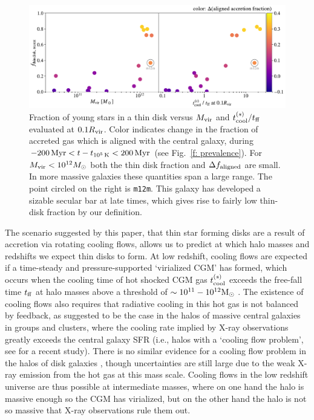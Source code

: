 \documentclass[fleqn,usenatbib]{mnras}
\newcommand{\tcools}{t_{10^5\,{\rm K}}}
\newcommand{\msun}{{\rm M}_\odot}
\begin{document}
\begin{figure}
    \centering
    \includegraphics[width=\textwidth]{figures/prevalence/aligned_fraction_vs_galaxy_props.pdf}
    \caption{
    Fraction of young stars in a thin disk versus $M_{\rm vir}$ and $t_{\rm cool}^{(s)}/t_{\rm ff}$ evaluated at $0.1 R_{\rm vir}$.
    Color indicates change in the fraction of accreted gas which is aligned with the central galaxy, during $-200\,{\rm Myr} < t-\tcools < 200\,{\rm Myr}$ (see Fig.~\ref{f: prevalence}).
    For $M_{\rm vir} < 10^{12} M_\odot$ both the thin disk fraction and $\Delta f_{\rm aligned}$ are small.
    In more massive galaxies these quantities span a large range.
    The point circled on the right is \texttt{m12m}.
    This galaxy has developed a sizable secular bar at late times, which gives rise to fairly low thin-disk fraction by our definition. 
    }
    \label{f: prevalence vs galaxy properties}
\end{figure}

\newcommand{\tcoolsh}{t_{\rm cool}^{(s)}}
\newcommand{\tff}{t_{\rm ff}}
\newcommand{\Mvir}{M_{\rm vir}}


The scenario suggested by this paper, that thin star forming disks are a result of accretion via rotating cooling flows, allows us to predict at which halo masses and redshifts we expect thin disks to form.
At low redshift, cooling flows are expected if a time-steady and pressure-supported `virialized CGM' has formed, which occurs when the cooling time of hot shocked CGM gas $\tcoolsh$ exceeds the free-fall time $\tff$ at halo masses above a threshold of $\sim10^{11}-10^{12}\msun$ \citep[e.g.,][]{White1978, White1991, Birnboim2003}.
The existence of cooling flows also requires that 
radiative cooling in this hot gas is not balanced by feedback, as suggested to be the case in the halos of massive central galaxies in groups and clusters, where the cooling rate implied by X-ray observations greatly exceeds the central galaxy SFR (i.e., halos with a `cooling flow problem', see \citealt{McDonald18} for a recent study).
There is no similar evidence for a cooling flow problem in the halos of disk galaxies \citep{Li14b}, though uncertainties are still large due to the weak X-ray emission from the hot gas at this mass scale. 
Cooling flows in the low redshift universe are thus possible at intermediate masses, where on one hand the halo is massive enough so the CGM has virialized, but on the other hand the halo is not so massive that X-ray observations rule them out. 
\end{document}
